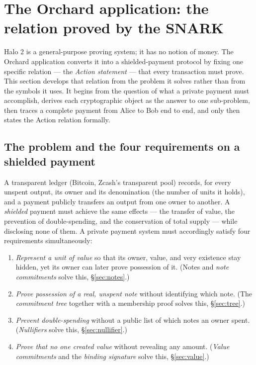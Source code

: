 \documentclass[11pt,a4paper]{article}
\theoremstyle{definition}
\begin{document}
\section{The Orchard application: the relation proved by the SNARK}\label{sec:orchard-app}

Halo 2 is a general-purpose proving system; it has no notion of money.
The Orchard application converts it into a shielded-payment protocol by
fixing one specific relation --- the \emph{Action statement} --- that
every transaction must prove. This section develops that relation from the
problem it solves rather than from the symbols it uses. It begins from the
question of what a private payment must accomplish,
derives each cryptographic object as the answer to one sub-problem, then
traces a complete payment from Alice to Bob end to end, and only then states
the Action relation formally.

\subsection{The problem and the four requirements on a shielded payment}\label{sec:orchard-problem}

A transparent ledger (Bitcoin, Zcash's transparent pool) records, for
every unspent output, its owner and its denomination (the number of units it holds),
and a payment publicly
transfers an output from one owner to another. A \emph{shielded} payment must achieve
the same effects --- the transfer of value, the prevention of double-spending, and the conservation of total
supply --- while disclosing none of them. A private
payment system must accordingly satisfy four requirements
simultaneously:

\begin{enumerate}[leftmargin=*]
\item \emph{Represent a unit of value} so that its owner, value, and very existence
stay hidden, yet its owner can later prove possession of it. (Notes and
\emph{note commitments} solve this, \S\ref{sec:notes}.)
\item \emph{Prove possession of a real, unspent note} without identifying which
note. (The \emph{commitment tree} together with a membership proof solves this,
\S\ref{sec:tree}.)
\item \emph{Prevent double-spending} without a public list of which notes
an owner spent. (\emph{Nullifiers} solve this, \S\ref{sec:nullifier}.)
\item \emph{Prove that no one created value} without revealing any amount.
(\emph{Value commitments} and the \emph{binding signature} solve this,
\S\ref{sec:value}.)
\end{enumerate}
\end{document}
